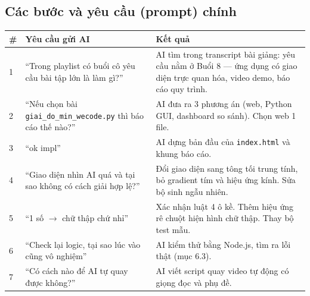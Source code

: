 \documentclass[12pt,a4paper]{article}
\begin{document}
\subsection{Các bước và yêu cầu (prompt) chính}
\begin{table}[H]
\centering
\small
\begin{tabularx}{\textwidth}{@{}p{0.4cm}p{5.2cm}X@{}}
\toprule
\textbf{\#} & \textbf{Yêu cầu gửi AI} & \textbf{Kết quả} \\
\midrule
1 & ``Trong playlist có buổi cô yêu cầu bài tập lớn là làm gì?'' & AI tìm trong transcript bài giảng: yêu cầu nằm ở Buổi 8 --- ứng dụng có giao diện trực quan hóa, video demo, báo cáo quy trình. \\
2 & ``Nếu chọn bài \texttt{giai\_do\_min\_wecode.py} thì báo cáo thế nào?'' & AI đưa ra 3 phương án (web, Python GUI, dashboard so sánh). Chọn web 1 file. \\
3 & ``ok impl'' & AI dựng bản đầu của \texttt{index.html} và khung báo cáo. \\
4 & ``Giao diện nhìn AI quá và tại sao không có cách giải hợp lệ?'' & Đổi giao diện sang tông tối trung tính, bỏ gradient tím và hiệu ứng kính. Sửa bộ sinh ngẫu nhiên. \\
5 & ``1 số $\to$ chữ thập chứ nhỉ'' & Xác nhận luật 4 ô kề. Thêm hiệu ứng rê chuột hiện hình chữ thập. Thay bộ test mẫu. \\
6 & ``Check lại logic, tại sao lúc vào cũng vô nghiệm'' & AI kiểm thử bằng Node.js, tìm ra lỗi thật (mục 6.3). \\
7 & ``Có cách nào để AI tự quay được không?'' & AI viết script quay video tự động có giọng đọc và phụ đề. \\
\bottomrule
\end{tabularx}
\end{table}
\end{document}
